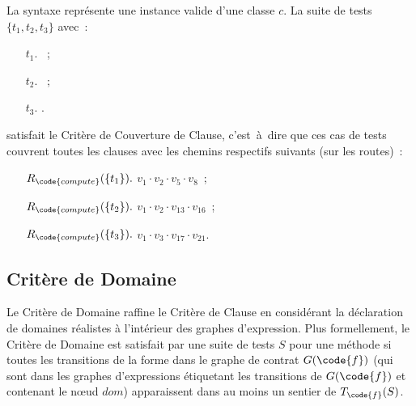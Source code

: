 \begin{example}

La syntaxe  représente une instance valide d'une classe $c$.
La suite de tests $\{t_1, t_2, t_3\}$ avec~:
%
\begin{itemize}

\item[$t_1.$]
%
~;

\item[$t_2.$]
%
~;

\item[$t_3.$]
%
.

\end{itemize}
%
satisfait le Critère de Couverture de Clause, c'est~à~dire que ces cas de tests
couvrent toutes les clauses avec les chemins respectifs suivants (sur les
routes)~:
%
\begin{itemize}

\item[$R_\code{compute}(\{t_1\}).$]
%
$v_1 \cdot v_2 \cdot v_5 \cdot v_8$~;

\item[$R_\code{compute}(\{t_2\}).$]
%
$v_1 \cdot v_2 \cdot v_{13} \cdot v_{16}$~;

\item[$R_\code{compute}(\{t_3\}).$]
%
$v_1 \cdot v_3 \cdot v_{17} \cdot v_{21}$.

\end{itemize}

\end{example}

\subsection{Critère de Domaine}

Le Critère de Domaine raffine le Critère de Clause en considérant la déclaration
de domaines réalistes à l'intérieur des graphes d'expression. Plus formellement,
le Critère de Domaine est satisfait par une suite de tests $S$ pour une méthode
 si toutes les transitions de la forme  dans le graphe de
contrat $G(\code{f})$ (qui sont dans les graphes d'expressions étiquetant les
transitions de $G(\code{f})$ et contenant le nœud $\mathit{dom}$) apparaissent
dans au moins un sentier de $T_\code{f}(S)$.

